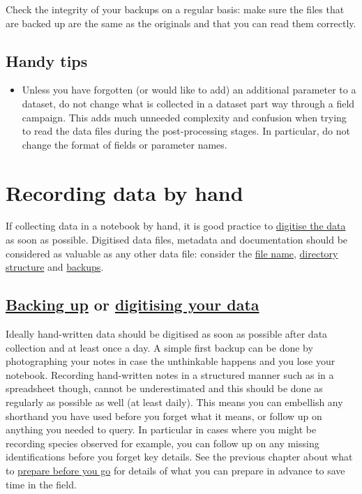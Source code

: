 \documentclass[12pt,a4paper,oneside]{report}
\providecommand{\tightlist}{%
  \setlength{\itemsep}{0pt}\setlength{\parskip}{0pt}}
\begin{document}
Check the integrity of your backups on a regular basis: make sure the
files that are backed up are the same as the originals and that you can
read them correctly.

\hypertarget{handy-tips-4}{%
\subsection{Handy tips}\label{handy-tips-4}}

\begin{itemize}
\tightlist
\item
  Unless you have forgotten (or would like to add) an additional
  parameter to a dataset, do not change what is collected in a dataset
  part way through a field campaign. This adds much unneeded complexity
  and confusion when trying to read the data files during the
  post-processing stages. In particular, do not change the format of
  fields or parameter names.
\end{itemize}

\hypertarget{recording-data-by-hand}{%
\section{Recording data by hand}\label{recording-data-by-hand}}

If collecting data in a notebook by hand, it is good practice to
\protect\hyperlink{data-backup-and-digitisation}{digitise the data} as
soon as possible. Digitised data files, metadata and documentation
should be considered as valuable as any other data file: consider the
\protect\hyperlink{file-naming}{file name},
\protect\hyperlink{directory-structure}{directory structure} and
\protect\hyperlink{backing-up-data}{backups}.

\hypertarget{backing-up-or-digitising-your-data}{%
\subsection{\texorpdfstring{\protect\hyperlink{backing-up-data}{Backing
up} or \protect\hyperlink{data-backup-and-digitisation}{digitising your
data}}{Backing up or digitising your data}}\label{backing-up-or-digitising-your-data}}

Ideally hand-written data should be digitised as soon as possible after
data collection and at least once a day. A simple first backup can be
done by photographing your notes in case the unthinkable happens and you
lose your notebook. Recording hand-written notes in a structured manner
such as in a spreadsheet though, cannot be underestimated and this
should be done as regularly as possible as well (at least daily). This
means you can embellish any shorthand you have used before you forget
what it means, or follow up on anything you needed to query. In
particular in cases where you might be recording species observed for
example, you can follow up on any missing identifications before you
forget key details. See the previous chapter about what to
\protect\hyperlink{preparing-for-data-collection-by-hand}{prepare before
you go} for details of what you can prepare in advance to save time in
the field.
\end{document}
